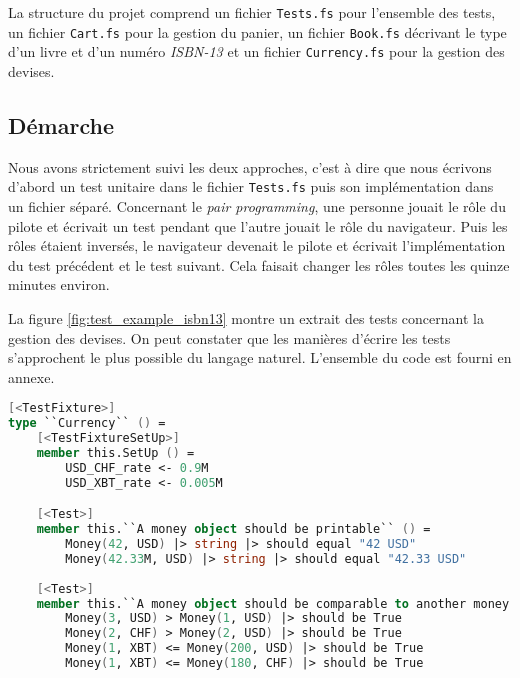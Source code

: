 \documentclass[journal, a4paper, frenchb]{IEEEtran}
\begin{document}
La structure du projet comprend un fichier \texttt{Tests.fs} pour l'ensemble des tests, un fichier \texttt{Cart.fs} pour la gestion du panier, un fichier \texttt{Book.fs} décrivant le type d'un livre et d'un numéro \emph{ISBN-13} et un fichier \texttt{Currency.fs} pour la gestion des devises.


\subsection{Démarche}

Nous avons strictement suivi les deux approches, c'est à dire que nous écrivons d'abord un test unitaire dans le fichier \texttt{Tests.fs} puis son implémentation dans un fichier séparé. Concernant le \emph{pair programming}, une personne jouait le rôle du pilote et écrivait un test pendant que l'autre jouait le rôle du navigateur. Puis les rôles étaient inversés, le navigateur devenait le pilote et écrivait l'implémentation du test précédent et le test suivant. Cela faisait changer les rôles toutes les quinze minutes environ.

La figure \ref{fig:test_example_isbn13} montre un extrait des tests concernant la gestion des devises. On peut constater que les manières d'écrire les tests s'approchent le plus possible du langage naturel. L'ensemble du code est fourni en annexe.

\begin{figure*}[!t]
\caption{Exemple de tests concernant le type \texttt{Money}}
\label{fig:test_example_isbn13}
\begin{lstlisting}[language=FSharp, frame=single, basicstyle=\ttfamily\small]
[<TestFixture>]
type ``Currency`` () =
    [<TestFixtureSetUp>]
    member this.SetUp () =
        USD_CHF_rate <- 0.9M
        USD_XBT_rate <- 0.005M

    [<Test>]
    member this.``A money object should be printable`` () =
        Money(42, USD) |> string |> should equal "42 USD"
        Money(42.33M, USD) |> string |> should equal "42.33 USD"
        
    [<Test>]
    member this.``A money object should be comparable to another money object`` () =
        Money(3, USD) > Money(1, USD) |> should be True
        Money(2, CHF) > Money(2, USD) |> should be True
        Money(1, XBT) <= Money(200, USD) |> should be True
        Money(1, XBT) <= Money(180, CHF) |> should be True
\end{lstlisting}
\end{figure*}
\end{document}
